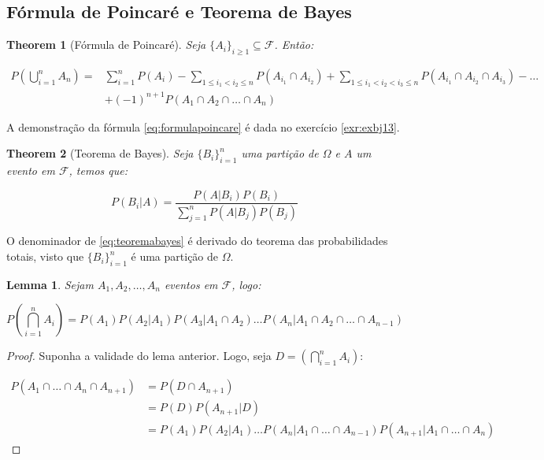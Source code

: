 \documentclass[
]{article}
\newtheorem{theorem}{Theorem}[section]
\newtheorem{lemma}{Lemma}[section]
\theoremstyle{definition}
\theoremstyle{definition}
\theoremstyle{definition}
\theoremstyle{definition}
\theoremstyle{remark}
\begin{document}
\hypertarget{fuxf3rmula-de-poincaruxe9-e-teorema-de-bayes}{%
\subsection{Fórmula de Poincaré e Teorema de Bayes}\label{fuxf3rmula-de-poincaruxe9-e-teorema-de-bayes}}

\begin{theorem}[Fórmula de Poincaré]
Seja \(\{A_{i}\}_{i \ge 1} \subseteq \mathcal{F}\). Então:

\begin{equation}
\begin{split}
P\left(\bigcup_{i=1}^{n} A_{n}\right) = &\sum_{i=1}^{n}P(A_{i}) - \sum_{1 \le i_{1} < i_{2} \le n} P(A_{i_{1}} \cap A_{i_{2}}) + \sum_{1 \le i_{1} < i_{2} < i_{3} \le n} P(A_{i_{1}} \cap A_{i_{2}} \cap A_{i_{3}}) - \dots \\
&+ (-1)^{n+1} P(A_{1} \cap A_{2} \cap \ldots \cap A_{n})
\label{eq:formulapoincare}
\end{split}
\end{equation}
\end{theorem}

A demonstração da fórmula \eqref{eq:formulapoincare} é dada no exercício \ref{exr:exbj13}.

\begin{theorem}[Teorema de Bayes]
Seja \(\{B_{i}\}_{i=1}^{n}\) uma partição de \(\Omega\) e \(A\) um evento em \(\mathcal{F}\), temos que:

\begin{equation}
P(B_{i}|A) = \frac{P(A|B_{i})P(B_{i})}{\sum_{j=1}^{n}P(A|B_{j})P(B_{j})}
\label{eq:teoremabayes}
\end{equation}
\end{theorem}

O denominador de \eqref{eq:teoremabayes} é derivado do teorema das probabilidades totais, visto que \(\{B_{i}\}_{i=1}^{n}\) é uma partição de \(\Omega\).

\begin{lemma}
Sejam \(A_{1},A_{2}, \ldots, A_{n}\) eventos em \(\mathcal{F}\), logo:

\begin{equation*}
P\left(\bigcap_{i=1}^{n}A_{i}\right) = P(A_{1})P(A_{2}|A_{1})P(A_{3}|A_{1} \cap A_{2}) \ldots P(A_{n}|A_{1} \cap A_{2} \cap \ldots \cap A_{n-1})
\end{equation*}
\end{lemma}

\begin{proof}
Suponha a validade do lema anterior. Logo, seja \(D = (\bigcap_{i=1}^{n}A_{i})\):

\begin{align*}
P(A_{1} \cap \ldots \cap A_{n} \cap A_{n+1}) &= P(D \cap A_{n+1}) \\
&= P(D)P(A_{n+1}|D) \\
&= P(A_{1})P(A_{2}|A_{1}) \ldots P(A_{n}|A_{1} \cap \ldots \cap A_{n-1})P(A_{n+1}|A_{1} \cap \ldots \cap A_{n})
\end{align*}
\end{proof}
\end{document}
